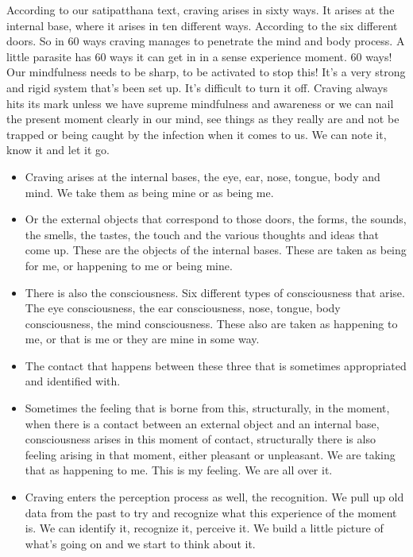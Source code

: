 \documentclass[letterpaper,10pt,english]{sphinxmanual}
\begin{document}
\sphinxAtStartPar
According  to  our  satipatthana  text,  craving  arises  in  sixty  ways.  It
arises at the internal base, where it arises in ten different ways. According
to the six different doors. So in 60 ways craving manages to penetrate the
mind and body process. A little parasite has 60 ways it can get in in a sense
experience moment. 60 ways! Our mindfulness needs to be sharp, to be activated to stop this! It’s a very strong and rigid system that’s been set up. It’s
difficult to turn it off. Craving always hits its mark unless we have supreme
mindfulness and awareness or we can nail the present moment clearly in our
mind, see things as they really are and not be trapped or being caught by the
infection when it comes to us. We can note it, know it and let it go.
\begin{itemize}
\item {} 
\sphinxAtStartPar
Craving  arises  at  the  internal  bases,  the  eye,  ear,  nose,  tongue,  body
and mind. We take them as being mine or as being me.

\item {} 
\sphinxAtStartPar
Or the external objects that correspond to those doors, the forms, the
sounds, the smells, the tastes, the touch and the various thoughts and
ideas that come up. These are the objects of the internal bases. These
are taken as being for me, or happening to me or being mine.

\item {} 
\sphinxAtStartPar
There is also the consciousness. Six different types of consciousness
that arise. The eye consciousness, the ear consciousness, nose, tongue,
body consciousness, the mind consciousness. These also are taken as
happening to me, or that is me or they are mine in some way.

\item {} 
\sphinxAtStartPar
The contact that happens between these three that is sometimes appropriated and identified with.

\item {} 
\sphinxAtStartPar
Sometimes the feeling that is borne from this, structurally, in the moment, when there is a contact between an external object and an internal base, consciousness arises in this moment of contact, structurally
there is also feeling arising in that moment, either pleasant or unpleasant. We are taking that as happening to me. This is my feeling. We are
all over it.

\item {} 
\sphinxAtStartPar
Craving enters the perception process as well, the recognition. We pull
up old data from the past to try and recognize what this experience of
the moment is. We can identify it, recognize it, perceive it. We build a
little picture of what’s going on and we start to think about it.


\end{itemize}
\end{document}
